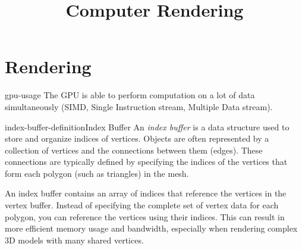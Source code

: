 \documentclass[preview]{standalone}
\begin{document}
\title{Computer Rendering}
\genpage

\section{Rendering}

\begin{snippet}{gpu-usage}
The GPU is able to perform computation on a lot of data simultaneously
(SIMD, Single Instruction stream, Multiple Data stream).
\end{snippet}


\begin{snippetdefinition}{index-buffer-definition}{Index Buffer}
    An \textit{index buffer} is a data structure used to store and organize indices of vertices.
    Objects are often represented by a collection of vertices and the connections between them (edges).
    These connections are typically defined by specifying the indices of the vertices that
    form each polygon (such as triangles) in the mesh.

    An index buffer contains an array of indices that reference the vertices in the vertex buffer. Instead of specifying the complete set of vertex data for each polygon, you can reference the vertices using their indices. This can result in more efficient memory usage and bandwidth, especially when rendering complex 3D models with many shared vertices.
\end{snippetdefinition}
\end{document}
